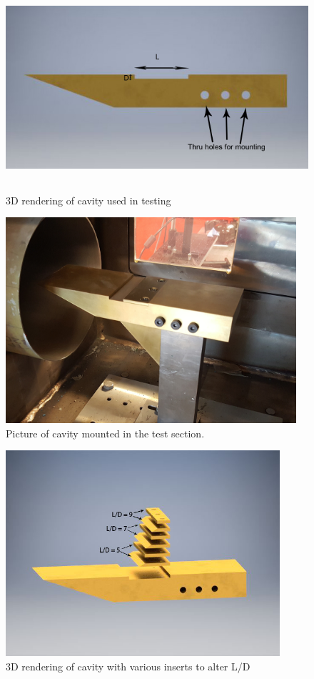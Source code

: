 \begin{figure}
\centering
\includegraphics[height = 3in]{Figures/Cavitylabel.jpg}
\caption[Cavity 3D Model]{3D rendering of cavity used in testing}
\label{fig:cavModel}
\end{figure}

\begin{figure}
\centering
\includegraphics[height = 3in]{Figures/cavPhoto.jpg}
\caption[Cavity in Test Section]{Picture of cavity mounted in the test section.}
\label{fig:cavTestSection}
\end{figure}

\begin{figure}
\centering
\includegraphics[height = 3in]{Figures/CavityInserts.jpg}
\caption[Cavity Model with Inserts]{3D rendering of cavity with various inserts to alter L/D}
\label{fig:cavInserts}
\end{figure}

